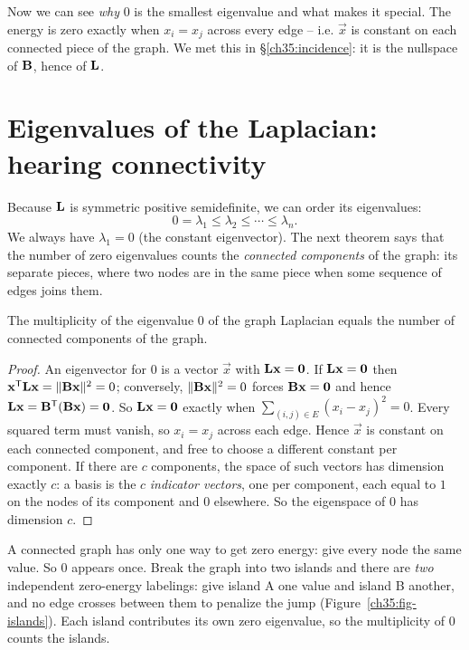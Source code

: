 Now we can see \emph{why} $0$ is the smallest eigenvalue and what makes it special. The
energy is zero exactly when $x_i = x_j$ across every edge -- i.e. $\vec{x}$ is constant on
each connected piece of the graph. We met this in \S\ref{ch35:incidence}: it is the
nullspace of $\mathbf{B}$, hence of $\mathbf{L}$.

\section{Eigenvalues of the Laplacian: hearing connectivity}
\label{ch35:spectrum}

Because $\mathbf{L}$ is symmetric positive semidefinite, we can order its eigenvalues:
\[
0 = \lambda_1 \le \lambda_2 \le \cdots \le \lambda_n.
\]
We always have $\lambda_1 = 0$ (the constant eigenvector). The next theorem says that the
number of zero eigenvalues counts the \emph{connected components} of the graph: its
separate pieces, where two nodes are in the same piece when some sequence of edges joins
them.

\begin{theorem}[Multiplicity of zero $=$ number of components]
\label{ch35:thm-components}
The multiplicity of the eigenvalue $0$ of the graph Laplacian equals the number of
connected components of the graph.
\end{theorem}

\begin{proof}
An eigenvector for $0$ is a vector $\vec{x}$ with $\mathbf{L}\mathbf{x}=\mathbf{0}$. If
$\mathbf{L}\mathbf{x}=\mathbf{0}$ then $\mathbf{x}^{\mathsf{T}}\mathbf{L}\mathbf{x} = \lVert\mathbf{B}\mathbf{x}\rVert^2 = 0$;
conversely, $\lVert\mathbf{B}\mathbf{x}\rVert^2 = 0$ forces $\mathbf{B}\mathbf{x}=\mathbf{0}$ and hence
$\mathbf{L}\mathbf{x}=\mathbf{B}^{\mathsf{T}}(\mathbf{B}\mathbf{x})=\mathbf{0}$. So $\mathbf{L}\mathbf{x}=\mathbf{0}$ exactly when
$\sum_{(i,j)\in E}(x_i-x_j)^2 = 0$. Every squared term must
vanish, so $x_i = x_j$ across each edge. Hence $\vec{x}$ is constant on each connected
component, and free to choose a different constant per component. If there are $c$
components, the space of such vectors has dimension exactly $c$: a basis is the $c$
\emph{indicator vectors}, one per component, each equal to $1$ on the nodes of its component
and $0$ elsewhere. So the eigenspace of $0$ has dimension $c$.
\end{proof}

\begin{intuitionbox}
A connected graph has only one way to get zero energy: give every node the same value. So
$0$ appears once. Break the graph into two islands and there are \emph{two} independent
zero-energy labelings: give island A one value and island B another, and no edge crosses
between them to penalize the jump (Figure~\ref{ch35:fig-islands}). Each island contributes
its own zero eigenvalue, so the multiplicity of $0$ counts the islands.
\end{intuitionbox}

